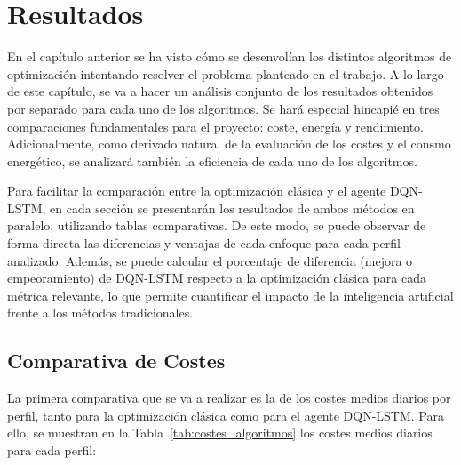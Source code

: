 \chapter{Resultados}
\label{chapter5}
En el capítulo anterior se ha visto cómo se desenvolían los distintos algoritmos de optimización 
intentando resolver el problema planteado en el trabajo. A lo largo de este capítulo, se va a hacer
un análisis conjunto de los resultados obtenidos por separado para cada uno de los algoritmos. Se 
hará especial hincapié en tres comparaciones fundamentales para el proyecto: coste, energía y 
rendimiento. Adicionalmente, como derivado natural de la evaluación de los costes y el consmo 
energético, se analizará también la eficiencia de cada uno de los algoritmos.

Para facilitar la comparación entre la optimización clásica y el agente DQN-LSTM, en cada sección 
se presentarán los resultados de ambos métodos en paralelo, utilizando tablas comparativas. De este 
modo, se puede observar de forma directa las diferencias y ventajas de cada enfoque para cada perfil 
analizado. Además, se puede calcular el porcentaje de diferencia (mejora o empeoramiento) de DQN-LSTM 
respecto a la optimización clásica para cada métrica relevante, lo que permite cuantificar el impacto 
de la inteligencia artificial frente a los métodos tradicionales.

\section{Comparativa de Costes}
La primera comparativa que se va a realizar es la de los costes medios diarios por perfil,
tanto para la optimización clásica como para el agente DQN-LSTM. Para ello, se muestran en la
Tabla~\ref{tab:costes_algoritmos} los costes medios diarios para cada perfil:
\begin{table}[H]
    \centering
    \caption{Comparativa de costes medios diarios por perfil entre la optimización clásica y el 
    agente DQN-LSTM, junto con el porcentaje de reducción de coste.}
    \label{tab:costes_algoritmos}
\end{table}

